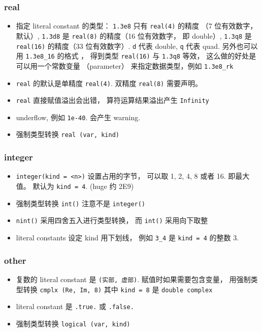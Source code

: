 \subsubsection{real}
\begin{itemize}
\item 指定 literal constant 的类型： \verb|1.3e8| 只有 \verb|real(4)| 的精度 （7 位有效数字， 默认）, \verb|1.3d8| 是 \verb|real(8)| 的精度（16 位有效数字， 即 double）, \verb|1.3q8| 是 \verb|real(16)| 的精度（33 位有效数字）. \verb|d| 代表 double, \verb|q| 代表 quad. 另外也可以用 \verb|1.3e8_16| 的格式 ， 得到类型  \verb|real(16)| 与 \verb|1.3q8| 等效， 这么做的好处是可以用一个常数变量 （parameter） 来指定数据类型，例如 \verb|1.3e8_rk|
\item \verb|real| 的默认是单精度 \verb|real(4)|. 双精度 \verb|real(8)| 需要声明。
\item \verb|real| 直接赋值溢出会出错， 算符运算结果溢出产生 \verb|Infinity|
\item underflow, 例如 \verb|1e-40|. 会产生 warning.
\item 强制类型转换 \verb|real (var, kind)|
\end{itemize}

\subsubsection{integer}
\begin{itemize}
\item \verb`integer(kind = <n>)` 设置占用的字节， 可以取 1, 2, 4, 8 或者 16. 即最大值。 默认为 
   \verb|kind = 4|. (huge 约 2E9)
\item 强制类型转换 \verb|int()| 注意不是 \verb|integer()|
\item \verb`nint()` 采用四舍五入进行类型转换， 而 \verb|int()| 采用向下取整
\item literal constants 设定 kind 用下划线， 例如 \verb`3_4` 是 \verb`kind = 4` 的整数 3.
\end{itemize}

\subsubsection{other}
\begin{itemize}
\item 复数的 literal constant 是 \verb|(实部, 虚部)|. 赋值时如果需要包含变量， 用强制类型转换 \verb|cmplx (Re, Im, 8)| 其中 \verb|kind = 8| 是 \verb|double complex|
\item literal constant 是 \verb|.true.| 或 \verb|.false.|
\item 强制类型转换 \verb|logical (var, kind)|
\end{itemize}

